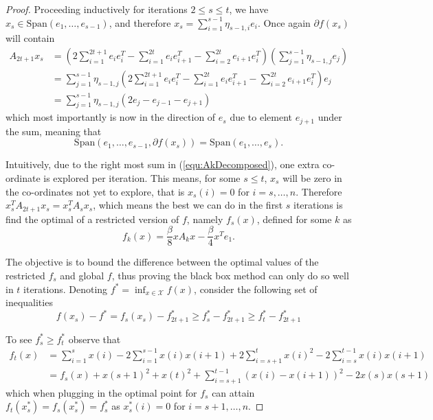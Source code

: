\begin{proof}
Proceeding inductively for iterations $2 \leq s \leq t$, we have $x_{s} \in \text{Span}(e_1,\dots,e_{s-1})$, and therefore $x_{s} = \sum_{i=1}^{s-1} \eta_{s-1,i} e_i$. Once again $\partial f(x_{s})$ will contain
\begin{align*}
A_{2t+1}x_{s} & =  \left(
2 \sum_{i=1}^{2t+1} e_i e_i^T - \sum_{i=1}^{2t} e_{i}e_{i+1}^T - \sum_{i=2}^{2t}e_{i+1} e_i^T
\right)
\left( \sum_{j=1}^{s-1} \eta_{s-1,j} e_j \right)\\
&=
\sum_{j=1}^{s-1} \eta_{s-1,j} \left(
2 \sum_{i=1}^{2t+1} e_i e_i^T - \sum_{i=1}^{2t} e_{i}e_{i+1}^T - \sum_{i=2}^{2t}e_{i+1} e_i^T
\right) e_j\\
&=
\sum_{j=1}^{s-1} \eta_{s-1,j} \left(
2 e_j - e_{j-1} - e_{j+1}
\right)
\end{align*}
which most importantly is now in the direction of $e_s$ due to element $e_{j+1}$ under the sum, meaning that 
\[
\text{Span}(e_1,\dots,e_{s-1},\partial f(x_{s})) = \text{Span}(e_1,\dots,e_s).
\]

Intuitively, due to the right most sum in (\ref{equ:AkDecomposed}), one extra co-ordinate is explored per iteration. This means, for some $s \leq t$, $x_s$ will be zero in the co-ordinates not yet to explore, that is $x_s(i) = 0$ for $i = s,\dots,n$. Therefore $x_s^T A_{2t+1}x_s = x_s^T A_s x_s$, which means the best we can do in the first $s$ iterations is find the optimal of a restricted version of $f$, namely $f_s(x)$, defined for some $k$ as
\begin{equation}
f_k(x) = \frac{\beta}{8}xA_k x - \frac{\beta}{4} x^T e_1.
\end{equation}

The objective is to bound the difference between the optimal values of the restricted $f_s$ and global $f$, thus proving the black box method can only do so well in $t$ iterations. Denoting $f^* = \inf_{x \in \mathcal{X}} f(x)$,  consider the following set of inequalities
\begin{equation}
f(x_s)- f^* = f_s(x_s) - f_{2t+1}^* \geq f_s^* - f_{2t + 1}^* \geq f_t^* - f_{2t + 1}^*
\label{equ:OptimDiff}
\end{equation}

To see $f_s^* \geq f_t^*$ observe that
\begin{align*}
f_t(x) & = \sum_{i=1}^s x(i) - 2 \sum_{i=1}^{s-1} x(i)x(i+1) + 2 \sum_{i=s+1}^t x(i)^2 - 2 \sum_{i=s}^{t-1}x(i)x(i+1) \\
&= f_s(x) + x(s+1)^2+ x(t)^2 + \sum_{i=s+1}^{t-1} (x(i) - x(i+1))^2 - 2x(s)x(s+1)
\end{align*}
which when plugging in the optimal point for $f_s$ can attain $f_t(x_s^*) = f_s(x_s^*) = f^*_s$ as $x_s^*(i) = 0$ for $i = s+1,\dots,n$.


\end{proof}
